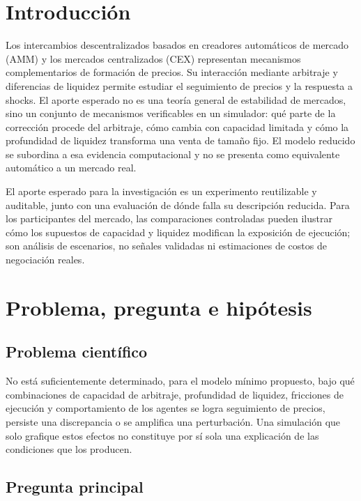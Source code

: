 \section{Introducción}

Los intercambios descentralizados basados en creadores automáticos de mercado (AMM) y
los mercados centralizados (CEX) representan mecanismos complementarios de
formación de precios. Su interacción mediante arbitraje y diferencias de liquidez
permite estudiar el seguimiento de precios y la respuesta a shocks. El aporte esperado
no es una teoría general de estabilidad de mercados, sino un conjunto de mecanismos
verificables en un simulador: qué parte de la corrección procede del arbitraje, cómo
cambia con capacidad limitada y cómo la profundidad de liquidez transforma una venta
de tamaño fijo. El modelo reducido se subordina a esa evidencia computacional y no se
presenta como equivalente automático a un mercado real.

El aporte esperado para la investigación es un experimento reutilizable y auditable,
junto con una evaluación de dónde falla su descripción reducida. Para los participantes
del mercado, las
comparaciones controladas pueden ilustrar cómo los supuestos de capacidad y liquidez
modifican la exposición de ejecución; son análisis de escenarios, no señales validadas
ni estimaciones de costos de negociación reales.

\section{Problema, pregunta e hipótesis}

\subsection{Problema científico}

No está suficientemente determinado, para el modelo mínimo propuesto, bajo qué
combinaciones de capacidad de arbitraje, profundidad de liquidez, fricciones de
ejecución y comportamiento de los agentes se logra seguimiento de precios, persiste
una discrepancia o se amplifica una perturbación. Una simulación que solo grafique
estos efectos no constituye por sí sola una explicación de las condiciones que los
producen.

\subsection{Pregunta principal}

